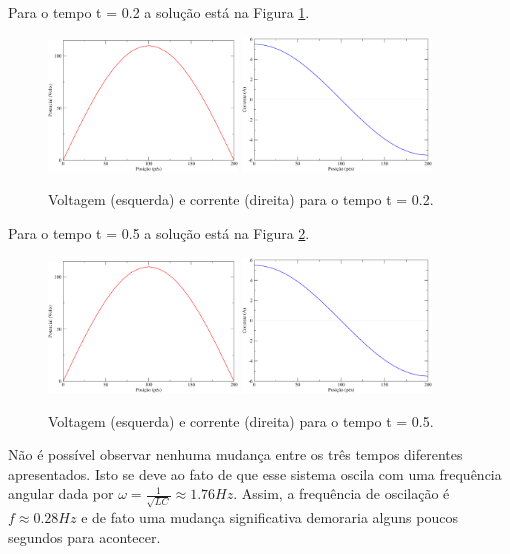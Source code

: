 \documentclass[a4wide]{report}
\begin{document}
Para o tempo t = 0.2 a solução está na Figura \ref{3b}.

\begin{figure}[!htb]
\centering
\includegraphics[width=0.447\textwidth]{V2.pdf}
\includegraphics[width=0.447\textwidth]{i2.pdf}
\caption{Voltagem (esquerda) e corrente (direita) para o tempo t = 0.2.}
\label{3b}
\end{figure}

Para o tempo t = 0.5 a solução está na Figura \ref{3c}.

\begin{figure}[!htb]
\centering
\includegraphics[width=0.447\textwidth]{V5.pdf}
\includegraphics[width=0.447\textwidth]{i5.pdf}
\caption{Voltagem (esquerda) e corrente (direita) para o tempo t = 0.5.}
\label{3c}
\end{figure}

Não é possível observar nenhuma mudança entre os três tempos diferentes apresentados. Isto se deve ao fato de que esse sistema oscila com uma frequência angular dada por $\omega = \frac{1}{\sqrt{LC}} \approx 1.76 Hz$. Assim, a frequência de oscilação é $ f \approx 0.28 Hz$ e de fato uma mudança significativa demoraria alguns poucos segundos para acontecer.
\end{document}
